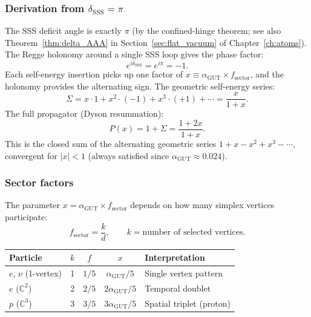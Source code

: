 \documentclass[12pt]{article}
\theoremstyle{remark}
\theoremstyle{definition}
\newcommand{\CC}{\mathbb{C}}
\newcommand{\agut}{\alpha_{\mathrm{GUT}}}
\begin{document}
\subsubsection{Derivation from $\delta_\mathrm{SSS} = \pi$}

The SSS deficit angle is exactly $\pi$ (by the confined-hinge theorem; see also Theorem~\ref{thm:delta_AAA} in Section~\ref{sec:flat_vacuum} of Chapter~\ref{ch:atoms}).  The Regge holonomy around a single SSS loop gives the phase factor:
\begin{equation}
e^{i\delta_\mathrm{SSS}} = e^{i\pi} = -1.
\end{equation}
Each self-energy insertion picks up one factor of $x \equiv \agut \times f_\mathrm{sector}$, and the holonomy provides the alternating sign.  The geometric self-energy series:
\begin{equation}
\Sigma = x \cdot 1 + x^2 \cdot (-1) + x^3 \cdot (+1) + \cdots = \frac{x}{1 + x}.
\end{equation}
The full propagator (Dyson resummation):
\begin{equation}
\label{eq:closed_propagator}
\boxed{P(x) = 1 + \Sigma = \frac{1 + 2x}{1 + x}.}
\end{equation}
This is the closed sum of the alternating geometric series $1 + x - x^2 + x^3 - \cdots$, convergent for $|x| < 1$ (always satisfied since $\agut \approx 0.024$).

\subsubsection{Sector factors}

The parameter $x = \agut \times f_\mathrm{sector}$ depends on how many simplex vertices participate:
\begin{equation}
f_\mathrm{sector} = \frac{k}{d}, \qquad k = \text{number of selected vertices.}
\end{equation}
\begin{center}
\begin{tabular}{lcccl}
\hline
Particle & $k$ & $f$ & $x$ & Interpretation \\
\hline
$e$, $\nu$ (1-vertex) & 1 & $1/5$ & $\agut/5$ & Single vertex pattern \\
$e$ ($\CC^2$) & 2 & $2/5$ & $2\agut/5$ & Temporal doublet \\
$p$ ($\CC^3$) & 3 & $3/5$ & $3\agut/5$ & Spatial triplet (proton) \\
\hline
\end{tabular}
\end{center}
\end{document}
